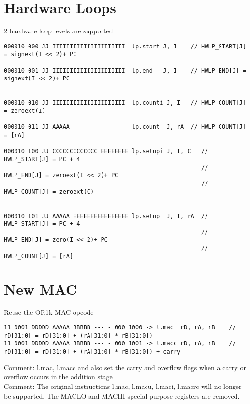 \begin{landscape}
\newpage
\section{Hardware Loops}
2 hardware loop levels are supported

\begin{verbatim}
000010 000 JJ IIIIIIIIIIIIIIIIIIIII  lp.start J, I    // HWLP_START[J] = signext(I << 2)+ PC

000010 001 JJ IIIIIIIIIIIIIIIIIIIII  lp.end   J, I    // HWLP_END[J] = signext(I << 2)+ PC


000010 010 JJ IIIIIIIIIIIIIIIIIIIII  lp.counti J, I   // HWLP_COUNT[J] = zeroext(I)

000010 011 JJ AAAAA ---------------- lp.count  J, rA  // HWLP_COUNT[J] = [rA]

000010 100 JJ CCCCCCCCCCCCC EEEEEEEE lp.setupi J, I, C   // HWLP_START[J] = PC + 4
                                                         // HWLP_END[J] = zeroext(I << 2)+ PC
                                                         // HWLP_COUNT[J] = zeroext(C)


000010 101 JJ AAAAA EEEEEEEEEEEEEEEE lp.setup  J, I, rA  // HWLP_START[J] = PC + 4
                                                         // HWLP_END[J] = zero(I << 2)+ PC
                                                         // HWLP_COUNT[J] = [rA]
\end{verbatim}



\newpage
\section{New MAC}

Reuse the OR1k MAC opcode
\begin{verbatim}
11 0001 DDDDD AAAAA BBBBB --- - 000 1000 -> l.mac  rD, rA, rB    // rD[31:0] = rD[31:0] + (rA[31:0] * rB[31:0])
11 0001 DDDDD AAAAA BBBBB --- - 000 1001 -> l.macc rD, rA, rB    // rD[31:0] = rD[31:0] + (rA[31:0] * rB[31:0]) + carry
\end{verbatim}

Comment: l.mac, l.macc and also set the carry and overflow flags when a carry or overflow occurs in the addition stage \\

Comment: The original instructions l.mac, l.macu, l.maci, l.macrc will no longer be supported.
         The MACLO and MACHI special purpose registers are removed. \\ \\



\end{landscape}
